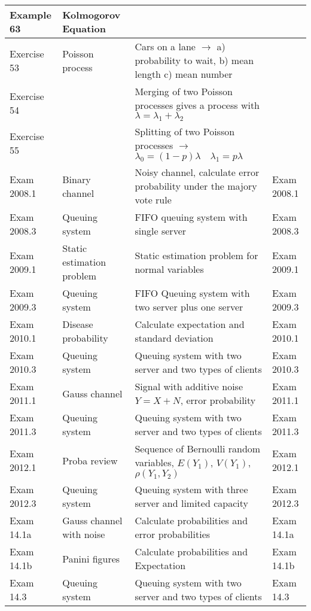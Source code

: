 \begin{tabular}{|l |p{4cm} |p{9.5cm}| l|}	
	\hline
	Example 63	&	Kolmogorov Equation			& 																	& \skript{136} \\
	\hline
	Exercise 53 &	Poisson process				& Cars on a lane $\to$ a) probability to wait, b) mean length c) mean number & \skript{141} \\
	\hline
	Exercise 54	&								& Merging of two Poisson processes gives a process with $\lambda = \lambda_1+\lambda_2$ & \skript{142} \\
	\hline
	Exercise 55 &								& Splitting of two Poisson processes $\to$ $\lambda_0=(1-p)\lambda \quad \lambda_1=p\lambda$ & \skript{142} \\
	\hline
	Exam 2008.1 &	Binary channel				& Noisy channel, calculate error probability under the majory vote rule & Exam 2008.1 \\
	\hline
	Exam 2008.3 &	Queuing system				& FIFO queuing system with single server & Exam 2008.3	\\
	\hline
	Exam 2009.1 &	Static estimation problem	& Static estimation problem for normal variables & Exam 2009.1 \\
	\hline
	Exam 2009.3 &	Queuing system				& FIFO Queuing system with two server plus one server & Exam 2009.3 \\
	\hline
	Exam 2010.1 &	Disease probability			& Calculate expectation and standard deviation & Exam 2010.1 \\
	\hline
	Exam 2010.3 &	Queuing system				& Queuing system with two server and two types of clients & Exam 2010.3 \\
	\hline
	Exam 2011.1 &	Gauss channel				& Signal with additive noise $Y=X+N$, error probability & Exam 2011.1 \\
	\hline
	Exam 2011.3 &	Queuing system				& Queuing system with two server and two types of clients & Exam 2011.3 \\
	\hline
	Exam 2012.1 &	Proba review				& Sequence of Bernoulli random variables, $E(Y_1)$, $V(Y_1)$, $\rho(Y_1, Y_2)$ & Exam 2012.1 \\
	\hline
	Exam 2012.3 &	Queuing system				& Queuing system with three server and limited capacity & Exam 2012.3 \\
	\hline
	Exam 14.1a  &	Gauss channel with noise	& Calculate probabilities and error probabilities & Exam 14.1a \\
	\hline
	Exam 14.1b	&	Panini figures				& Calculate probabilities and Expectation & Exam 14.1b \\
	\hline
	Exam 14.3	&	Queuing system				& Queuing system with two server and two types of clients & Exam 14.3 \\
	\hline
\end{tabular} 